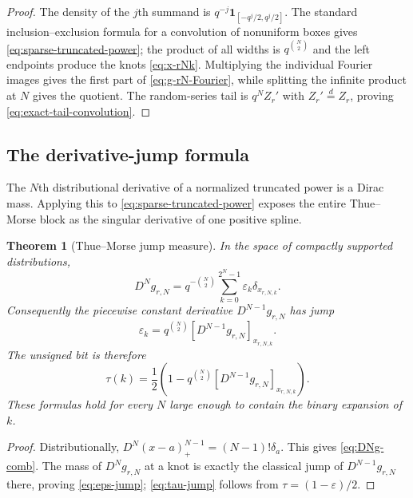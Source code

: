 \documentclass[11pt,oneside]{article}
\numberwithin{equation}{section}
\newtheorem{theorem}{Theorem}[section]
\theoremstyle{definition}
\theoremstyle{remark}
\newcommand{\eps}{\varepsilon}
\newcommand{\pospart}[1]{\left(#1\right)_{+}}
\newcommand{\jump}[2]{\left[#1\right]_{#2}}
\begin{document}
\begin{proof}
The density of the $j$th summand is
$q^{-j}\mathbf1_{[-q^j/2,q^j/2]}$.  The standard inclusion--exclusion formula
for a convolution of nonuniform boxes gives
\eqref{eq:sparse-truncated-power}; the product of all widths is
$q^{\binom N2}$ and the left endpoints produce the knots
\eqref{eq:x-rNk}.  Multiplying the individual Fourier images gives the first
part of \eqref{eq:g-rN-Fourier}, while splitting the infinite product at $N$
gives the quotient.  The random-series tail is
$q^NZ_r'$ with $Z_r'\overset d=Z_r$, proving
\eqref{eq:exact-tail-convolution}.
\end{proof}

\subsection{The derivative-jump formula}

The $N$th distributional derivative of a normalized truncated power is a
Dirac mass.  Applying this to \eqref{eq:sparse-truncated-power} exposes the
entire Thue--Morse block as the singular derivative of one positive spline.

\begin{theorem}[Thue--Morse jump measure]
\label{thm:TM-jump-measure}
In the space of compactly supported distributions,
\begin{equation}
 \boxed{\displaystyle
 D^Ng_{r,N}=q^{-\binom N2}
   \sum_{k=0}^{2^N-1}\eps_k\delta_{x_{r,N,k}}.}            \label{eq:DNg-comb}
\end{equation}
Consequently the piecewise constant derivative $D^{N-1}g_{r,N}$ has jump
\begin{equation}
 \boxed{\displaystyle
 \eps_k=q^{\binom N2}
 \jump{D^{N-1}g_{r,N}}{x_{r,N,k}}.}                       \label{eq:eps-jump}
\end{equation}
The unsigned bit is therefore
\begin{equation}
 \boxed{\displaystyle
 \tau(k)=\frac12\left(1-q^{\binom N2}
 \jump{D^{N-1}g_{r,N}}{x_{r,N,k}}\right).}                \label{eq:tau-jump}
\end{equation}
These formulas hold for every $N$ large enough to contain the binary expansion
of $k$.
\end{theorem}

\begin{proof}
Distributionally,
$D^N\pospart{x-a}^{N-1}=(N-1)!\delta_a$.
This gives \eqref{eq:DNg-comb}.  The mass of $D^Ng_{r,N}$ at a knot is exactly
the classical jump of $D^{N-1}g_{r,N}$ there, proving
\eqref{eq:eps-jump}; \eqref{eq:tau-jump} follows from
$\tau=(1-\eps)/2$.
\end{proof}
\end{document}
